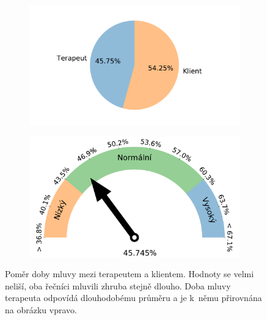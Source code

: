 \begin{figure}[ht]
    \begin{subfigure}{0.5\textwidth}
        \centering
        \includegraphics[width=\linewidth]{obrazky-figures/text_plots/speech_ratio.pdf}
    \end{subfigure}%
    \hspace*{\fill}
    \begin{subfigure}{0.5\textwidth}
        \includegraphics[width=\linewidth]{obrazky-figures/text_plots/speech_ratio_overall.pdf}
    \end{subfigure}
    
    \caption{Poměr doby mluvy mezi terapeutem a klientem. Hodnoty se velmi neliší, oba řečníci mluvili zhruba stejně dlouho. Doba mluvy terapeuta odpovídá dlouhodobému průměru a je k~němu přirovnána na obrázku vpravo.}
    \label{fig:Statisctics_ratio}
\end{figure}



